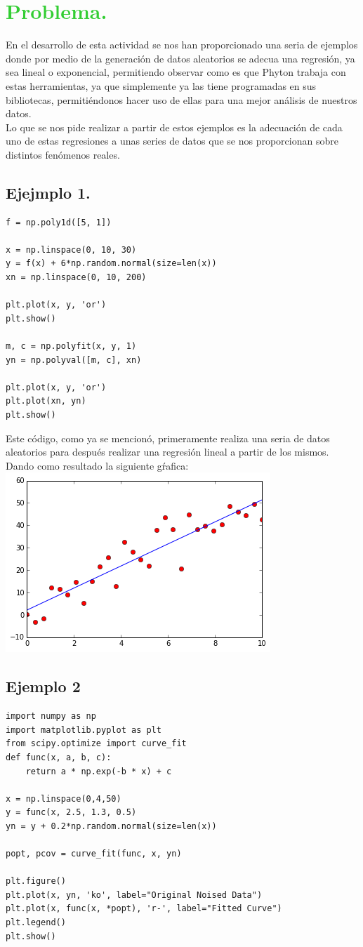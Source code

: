 \documentclass[12pt]{article}
\begin{document}
\section*{\textcolor{LimeGreen}{Problema.}}
En el desarrollo de esta actividad se nos han proporcionado una seria de ejemplos donde por medio de la generación de datos aleatorios se adecua una regresión, ya sea lineal o exponencial, permitiendo observar como es que Phyton trabaja con estas herramientas, ya que simplemente ya las tiene programadas en sus bibliotecas, permitiéndonos hacer uso de ellas para una mejor análisis de nuestros datos.\\
Lo que se nos pide realizar a partir de estos ejemplos es la adecuación de cada uno de estas regresiones a unas series de datos que se nos proporcionan sobre distintos fenómenos reales.
\subsection*{Ejejmplo 1.}
\begin{verbatim}
f = np.poly1d([5, 1])

x = np.linspace(0, 10, 30)
y = f(x) + 6*np.random.normal(size=len(x))
xn = np.linspace(0, 10, 200)

plt.plot(x, y, 'or')
plt.show()

m, c = np.polyfit(x, y, 1)
yn = np.polyval([m, c], xn)

plt.plot(x, y, 'or')
plt.plot(xn, yn)
plt.show()
\end{verbatim}
Este código, como ya se mencionó, primeramente realiza una seria de datos aleatorios para después realizar una regresión lineal a partir de los mismos. Dando como resultado la siguiente gŕafica:\\
\includegraphics{4c.png}

\subsection*{Ejemplo 2}
\begin{verbatim}
import numpy as np
import matplotlib.pyplot as plt
from scipy.optimize import curve_fit
def func(x, a, b, c):
    return a * np.exp(-b * x) + c

x = np.linspace(0,4,50)
y = func(x, 2.5, 1.3, 0.5)
yn = y + 0.2*np.random.normal(size=len(x))

popt, pcov = curve_fit(func, x, yn)

plt.figure()
plt.plot(x, yn, 'ko', label="Original Noised Data")
plt.plot(x, func(x, *popt), 'r-', label="Fitted Curve")
plt.legend()
plt.show()
\end{verbatim}
\end{document}
